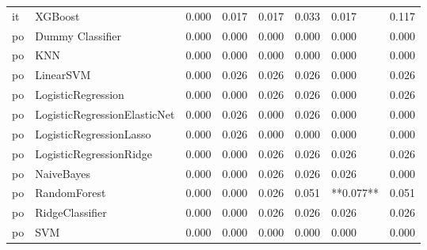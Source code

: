 \begin{tabular}{llllllll}
      it &                      XGBoost & 0.000 &                     0.017 &                 0.017 &                  0.033 &                                   0.017 &     0.117 \\
      po &             Dummy Classifier & 0.000 &                     0.000 &                 0.000 &                  0.000 &                                   0.000 &     0.000 \\
      po &                          KNN & 0.000 &                     0.000 &                 0.000 &                  0.000 &                                   0.000 &     0.000 \\
      po &                    LinearSVM & 0.000 &                     0.026 &                 0.026 &                  0.026 &                                   0.000 &     0.026 \\
      po &           LogisticRegression & 0.000 &                     0.000 &                 0.026 &                  0.026 &                                   0.000 &     0.026 \\
      po & LogisticRegressionElasticNet & 0.000 &                     0.026 &                 0.000 &                  0.026 &                                   0.000 &     0.000 \\
      po &      LogisticRegressionLasso & 0.000 &                     0.026 &                 0.000 &                  0.000 &                                   0.000 &     0.000 \\
      po &      LogisticRegressionRidge & 0.000 &                     0.000 &                 0.026 &                  0.026 &                                   0.026 &     0.026 \\
      po &                   NaiveBayes & 0.000 &                     0.000 &                 0.026 &                  0.026 &                                   0.026 &     0.000 \\
      po &                 RandomForest & 0.000 &                     0.000 &                 0.026 &                  0.051 &                               **0.077** &     0.051 \\
      po &              RidgeClassifier & 0.000 &                     0.000 &                 0.026 &                  0.026 &                                   0.026 &     0.026 \\
      po &                          SVM & 0.000 &                     0.000 &                 0.000 &                  0.000 &                                   0.000 &     0.000 \\

\end{tabular}
